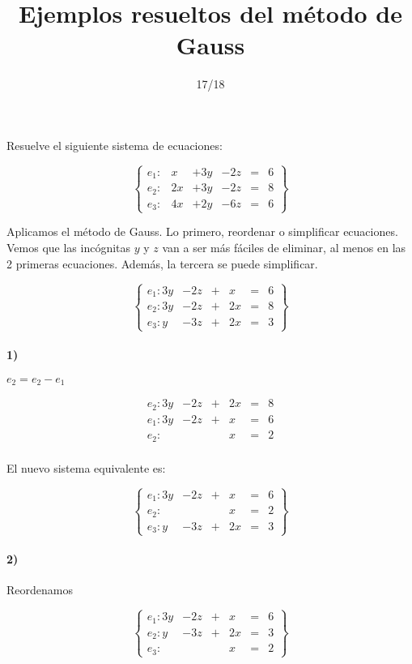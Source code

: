 \documentclass[palatino,nosec]{Docencia}
\title{Ejemplos resueltos del método de Gauss}
\author{}
\date{17/18}
\begin{document}
\pagestyle{plain}
\newpage
\begin{problem}
Resuelve el siguiente sistema de ecuaciones:

\[
\left\{\begin{array}{lccccc}
e_1: &x&+3y&-2z&=&6\\
e_2: &2x&+3y&-2z&=&8\\
e_3: &4x&+2y&-6z&=&6
\end{array}\right\}
\]

\solution

Aplicamos el método de Gauss. Lo primero, reordenar o simplificar ecuaciones. Vemos que las incógnitas $y$ y $z$ van a ser más fáciles de eliminar, al menos en las 2 primeras ecuaciones. Además, la tercera se puede simplificar.


\[
\left\{\begin{array}{lccccc}
e_1: 3y&-2z&+&x&=&6\\
e_2: 3y&-2z&+&2x&=&8\\
e_3: y&-3z&+&2x&=&3
\end{array}\right\}
\]


\paragraph{1)}
$e_2 = e_2-e_1$

\[
\begin{array}{lccccc}
e_2: 3y&-2z&+&2x&=&8\\
e_1: 3y&-2z&+&x&=&6\\
\hline
e_2: &&&x&=&2\\
\end{array}
\]	

El nuevo sistema equivalente es:

\[
\left\{\begin{array}{lccccc}
e_1: 3y&-2z&+&x&=&6\\
e_2: &&&x&=&2\\
e_3: y&-3z&+&2x&=&3
\end{array}\right\}
\]


\paragraph{2)} Reordenamos

\[
\left\{\begin{array}{lccccc}
e_1: 3y&-2z&+&x&=&6\\
e_2: y&-3z&+&2x&=&3\\
e_3: &&&x&=&2
\end{array}\right\}
\]


\end{problem}
\end{document}
